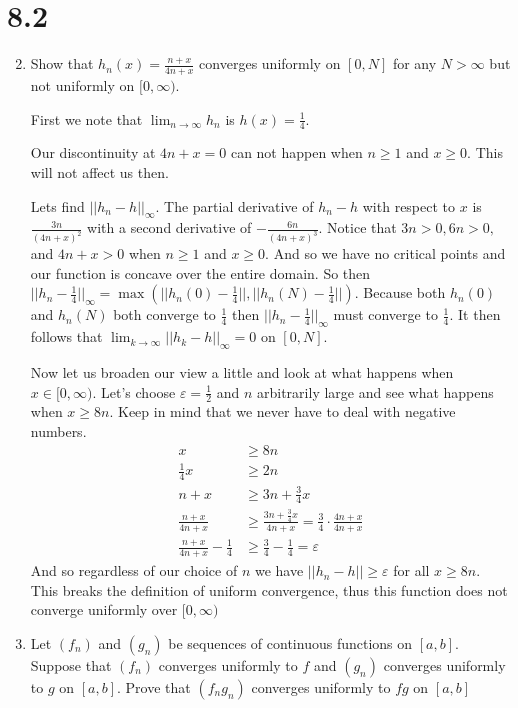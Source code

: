 \documentclass[letterpaper]{article}
\begin{document}
\renewcommand{\labelenumi}{\Alph{enumi}.}
\renewcommand{\labelenumii}{(\alph{enumii})}
\section*{8.2}
\begin{enumerate}
\setcounter{enumi}{1}
\item
Show that $h_n(x)=\frac{n+x}{4n+x}$ converges uniformly on $[0,N]$ for any $N>\infty$ but not uniformly on $[0,\infty)$.

First we note that $\displaystyle \lim_{n\to\infty}h_n$ is $h(x)=\frac{1}{4}$.

Our discontinuity at $4n+x=0$ can not happen when $n\ge 1$ and $x\ge 0$. This will not affect us then.

Lets find $||h_n-h||_\infty$.
The partial derivative of $h_n-h$ with respect to $x$ is $\displaystyle \frac{3n}{(4n+x)^2}$ with a second derivative of $\displaystyle -\frac{6n}{(4n+x)^3}$.
Notice that $3n>0, 6n>0,$ and $4n+x>0$ when $n\ge 1$ and $x\ge0$. And so we have no critical points and our function is concave over the entire domain.
So then $||h_n-\frac{1}{4}||_\infty=\max(||h_n(0)-\frac{1}{4}||,||h_n(N)-\frac{1}{4}||)$.
Because both $h_n(0)$ and $h_n(N)$ both converge to $\frac{1}{4}$ then $||h_n-\frac{1}{4}||_\infty$ must converge to $\frac{1}{4}$.
It then follows that $\displaystyle \lim_{k\to\infty}||h_k-h||_\infty=0$ on $[0,N]$.

Now let us broaden our view a little and look at what happens when $x\in[0,\infty)$. Let's choose $\varepsilon=\frac{1}{2}$ and $n$ arbitrarily large and see what happens when $x\ge 8n$. Keep in mind that we never have to deal with negative numbers.
\begin{align*}
  x&\ge 8n\\
  \frac{1}{4}x&\ge 2n\\
  n+x&\ge3n+\frac{3}{4}x\\
  \frac{n+x}{4n+x}&\ge\frac{3n+\frac{3}{4}x}{4n+x}=\frac{3}{4}\cdot\frac{4n+x}{4n+x}\\
  \frac{n+x}{4n+x}-\frac{1}{4}&\ge\frac{3}{4}-\frac{1}{4}=\varepsilon
\end{align*}
And so regardless of our choice of $n$ we have $||h_n-h||\ge \varepsilon$ for all $x\ge 8n$. This breaks the definition of uniform convergence, thus this function does not converge uniformly over $[0,\infty)$
\setcounter{enumi}{3}
\item
Let $(f_n)$ and $(g_n)$ be sequences of continuous functions on $[a,b]$. Suppose that $(f_n)$ converges uniformly to $f$ and $(g_n)$ converges uniformly to $g$ on $[a,b]$. Prove that $(f_ng_n)$ converges uniformly to $fg$ on $[a,b]$


\end{enumerate}
\end{document}
